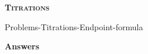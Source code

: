 \documentclass[main.tex]{subfiles}
\newcommand\chapterlabel{Ch-acidbase}
\begin{document}
\begin{multicols*}{2}
{\raggedright\textsc{\textbf{Titrations}}\par}
 {Problems-Titrations-Endpoint-formula}

%

\end{multicols*}


\newpage \begin{answerbox}
\begin{answersenvironment}
 \begin{localsize}{10}
{\Large \bf Answers}
\printsolutions 
 \end{localsize}
 \end{answersenvironment}
\end{answerbox}
\end{document}
